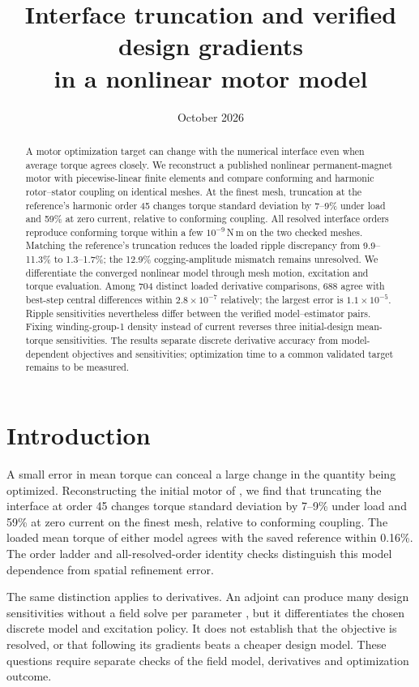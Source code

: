 \documentclass{anvil-paper}
\title{Interface truncation and verified design gradients\\
in a nonlinear motor model}
\author{}
\date{October 2026}
\begin{document}
\maketitle
\begin{abstract}
A motor optimization target can change with the numerical interface even
when average torque agrees closely. We reconstruct a published nonlinear
permanent-magnet motor with piecewise-linear finite elements and compare
conforming and harmonic rotor--stator coupling on identical meshes.
At the finest mesh, truncation at the reference's harmonic order 45 changes
torque standard deviation by 7--9\% under load and 59\% at zero current,
relative to conforming coupling. All resolved interface orders reproduce
conforming torque within a few $10^{-9}$\,N\,m on the two checked meshes.
Matching the reference's truncation reduces the loaded ripple discrepancy
from 9.9--11.3\% to 1.3--1.7\%; the 12.9\% cogging-amplitude mismatch
remains unresolved. We differentiate the converged nonlinear model through
mesh motion, excitation and torque evaluation. Among 704 distinct loaded
derivative comparisons, 688 agree with best-step central differences within
$2.8\times10^{-7}$ relatively; the largest error is $1.1\times10^{-5}$.
Ripple sensitivities nevertheless differ between the verified
model--estimator pairs. Fixing winding-group-1 density instead of current
reverses three initial-design mean-torque sensitivities.
The results separate discrete derivative accuracy from model-dependent
objectives and sensitivities; optimization time to a common validated
target remains to be measured.

\end{abstract}

\section{Introduction}
A small error in mean torque can conceal a large change in the quantity
being optimized. Reconstructing the initial motor of
\citet{wiesheu2024spline}, we find that truncating the interface at order 45
changes torque standard deviation by 7--9\% under load and 59\% at zero
current on the finest mesh, relative to conforming coupling. The loaded
mean torque of either model agrees with the saved reference within 0.16\%.
The order ladder and all-resolved-order identity checks distinguish this
model dependence from spatial refinement error.

The same distinction applies to derivatives. An adjoint can produce many
design sensitivities without a field solve per parameter
\citep{scotzniovsky2025}, but it differentiates the chosen discrete model
and excitation policy. It does not establish that the objective is
resolved, or that following its gradients beats a cheaper design model.
These questions require separate checks of the field model, derivatives
and optimization outcome.
\end{document}
